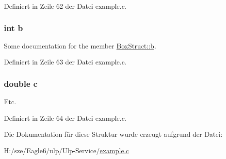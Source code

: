Definiert in Zeile 62 der Datei example.\+c.

\hypertarget{struct_box_struct__struct_a148e3876077787926724625411d6e7a9}{}
\subsubsection[{b}]{\setlength{\rightskip}{0pt plus 5cm}int b}\label{struct_box_struct__struct_a148e3876077787926724625411d6e7a9}
Some documentation for the member \hyperlink{struct_box_struct__struct_a148e3876077787926724625411d6e7a9}{Box\+Struct\+::b}. 

Definiert in Zeile 63 der Datei example.\+c.

\hypertarget{struct_box_struct__struct_a2c09e929a6ea340fc9653cca414b11d3}{}
\subsubsection[{c}]{\setlength{\rightskip}{0pt plus 5cm}double c}\label{struct_box_struct__struct_a2c09e929a6ea340fc9653cca414b11d3}
Etc. 

Definiert in Zeile 64 der Datei example.\+c.



Die Dokumentation für diese Struktur wurde erzeugt aufgrund der Datei\+:\begin{DoxyCompactItemize}
\item 
H\+:/sze/\+Eagle6/ulp/\+Ulp-\/\+Service/\hyperlink{example_8c}{example.\+c}\end{DoxyCompactItemize}
